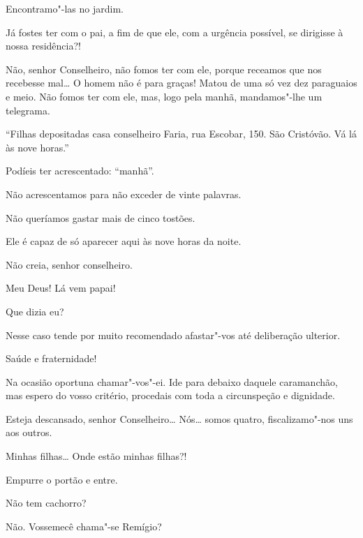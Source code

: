 \begin{linenumbers}
 Encontramo"-las no jardim. 

 Já fostes ter com o pai, a fim de que ele, com a urgência
possível, se dirigisse à nossa residência?!

 Não, senhor Conselheiro, não fomos ter com ele, porque receamos que
nos recebesse mal\ldots{} O homem não é para graças! Matou de uma só vez dez
paraguaios e meio. Não fomos ter com ele, mas, logo pela manhã, mandamos"-lhe um
telegrama.

 ``Filhas depositadas casa conselheiro Faria, rua Escobar, 150.
São Cristóvão. Vá lá às nove horas.''

 Podíeis ter acrescentado: ``manhã''.

 Não acrescentamos para não exceder de vinte palavras.

 Não queríamos gastar mais de cinco tostões.

 Ele é capaz de só aparecer aqui às nove horas da noite.

 Não creia, senhor conselheiro.

  Meu Deus! Lá vem papai!

 Que dizia eu?

 Nesse caso tende por muito recomendado afastar"-vos até deliberação
ulterior.

  Saúde e fraternidade!

 Na ocasião oportuna chamar"-vos"-ei. Ide para debaixo daquele
caramanchão, mas espero do vosso critério, procedais com toda a circunspeção e
dignidade.

 Esteja descansado, senhor Conselheiro\ldots{} Nós\ldots{} somos quatro,
fiscalizamo"-nos uns aos outros. 




  Minhas filhas\ldots{} Onde estão minhas filhas?!

 Empurre o portão e entre.

 Não tem cachorro?

 Não.  Vossemecê chama"-se Remígio?


\end{linenumbers}
